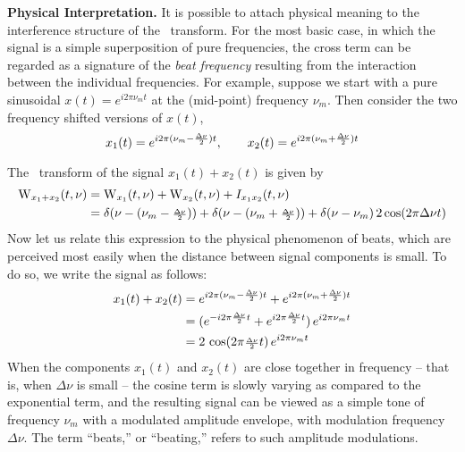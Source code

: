 \begin{define}{\bf Physical Interpretation. }  It is possible to attach
physical meaning to the interference structure of the \WV\ transform.
For the most basic case, in which the signal is a simple superposition
of pure frequencies, the cross term %
can be regarded as a signature of the \emph{beat frequency} resulting
from the interaction between %
the individual frequencies.  For example, suppose we start with a pure
sinusoidal $x(t) = e^{i2\pi\nu_m t}$ at the (mid-point) frequency
$\nu_m$.  Then consider the two frequency shifted versions of $x(t)$,
\[%
x_1(t)%
      =e^{i2\pi(\nu_m-\halfDnu)t},\qquad
x_2(t)%
      = e^{i2\pi(\nu_m+\halfDnu)t}
\]%
\end{define}
The \WV\ transform of the signal $x_1(t) + x_2(t)$ is given by
\begin{align}%
\label{eq:WignerBeats}
  \W_{x_1+x_2}(t,\nu)
    &= \W_{x_1}(t,\nu)+\W_{x_2}(t,\nu) + I_{x_1x_2}(t,\nu)\\
    &=\delta(\nu-(\nu_m-\halfDnu))+\delta(\nu-(\nu_m+\halfDnu))
      + \delta(\nu-\nu_m)\,2\cos(2\pi \Delta\nu t) \nonumber
\end{align}%
Now let us relate this expression to the physical phenomenon of
beats, which are perceived most easily when the distance between
signal components %
is small.  To do so, we write the signal as follows:
\begin{align}
x_1(t)+x_2(t) 
    &= e^{i2\pi(\nu_m-{\scriptstyle \frac{\Delta\nu}{2}})t} 
       + e^{i2\pi(\nu_m+{\scriptstyle \frac{\Delta\nu}{2}})t}\nonumber \\
    &= (e^{-i2\pi{\scriptstyle \frac{\Delta\nu}{2}} t} + e^{i2\pi{\scriptstyle \frac{\Delta\nu}{2}} t})\,
       e^{i2\pi\nu_m t}\nonumber \\ 
    &= 2\,\cos(2\pi{\scriptstyle \frac{\Delta\nu}{2}} t)\,e^{i2\pi\nu_m t}\label{eq:sigbeats}
\end{align}
When the components $x_1(t)$ and $x_2(t)$ are close together in
frequency -- that is, when $\Delta\nu$ is small -- the cosine term is
slowly varying as compared to the exponential term, and the resulting
signal can be viewed as a simple tone of frequency $\nu_m$ with
a modulated amplitude envelope, with modulation frequency $\Delta\nu$.
The term ``beats,'' or ``beating,'' refers to such
amplitude modulations. %

